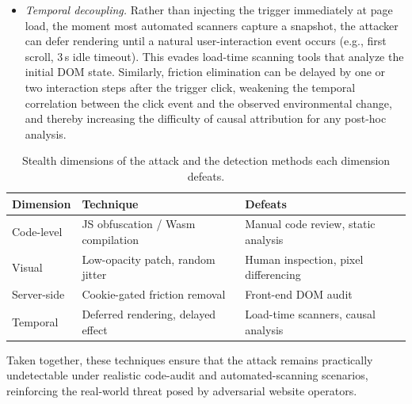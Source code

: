 \documentclass{article}
\begin{document}
\begin{itemize}
\item \emph{Temporal decoupling.}
Rather than injecting the trigger immediately at page load, the moment most automated scanners capture a snapshot, the attacker can defer rendering until a natural user-interaction event occurs (e.g., first scroll, 3\,s idle timeout).
This evades load-time scanning tools that analyze the initial DOM state.
Similarly, friction elimination can be delayed by one or two interaction steps after the trigger click, weakening the temporal correlation between the click event and the observed environmental change, and thereby increasing the difficulty of causal attribution for any post-hoc analysis.
\end{itemize}


\begin{table}[h]
\centering
\caption{Stealth dimensions of the attack and the detection methods each dimension defeats.}
\label{tab:stealth_summary}
\small
\begin{tabular}{lll}
\toprule
\textbf{Dimension} & \textbf{Technique} & \textbf{Defeats} \\
\midrule
Code-level        & JS obfuscation / Wasm compilation     & Manual code review, static analysis \\
Visual            & Low-opacity patch, random jitter       & Human inspection, pixel differencing \\
Server-side       & Cookie-gated friction removal          & Front-end DOM audit \\
Temporal          & Deferred rendering, delayed effect     & Load-time scanners, causal analysis \\
\bottomrule
\end{tabular}
\end{table}

Taken together, these techniques ensure that the attack remains practically undetectable under realistic code-audit and automated-scanning scenarios, reinforcing the real-world threat posed by adversarial website operators.
\end{document}
